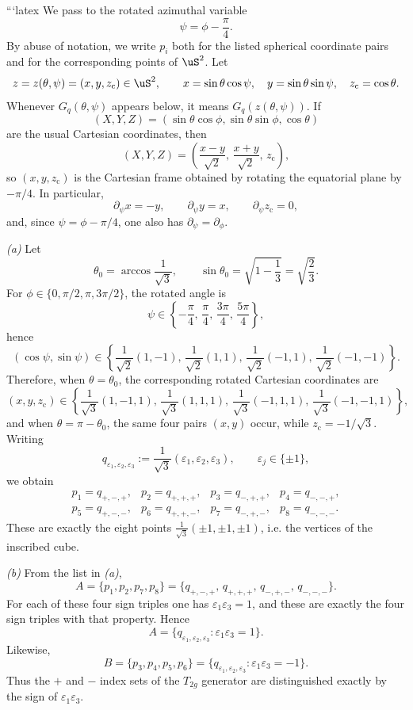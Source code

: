 ```latex
We pass to the rotated azimuthal variable
\[
\psi=\phi-\frac{\pi}{4}.
\]
By abuse of notation, we write \(p_i\) both for the listed spherical coordinate pairs and for the corresponding points of \(\uS^2\). Let
\[
z=z(\theta,\psi)=(x,y,z_{\mathrm c})\in \uS^2,
\qquad
x=\sin\theta\cos\psi,\quad y=\sin\theta\sin\psi,\quad z_{\mathrm c}=\cos\theta.
\]
Whenever \(G_q(\theta,\psi)\) appears below, it means \(G_q(z(\theta,\psi))\). If
\[
(X,Y,Z)=(\sin\theta\cos\phi,\sin\theta\sin\phi,\cos\theta)
\]
are the usual Cartesian coordinates, then
\[
(X,Y,Z)=\left(\frac{x-y}{\sqrt2},\,\frac{x+y}{\sqrt2},\,z_{\mathrm c}\right),
\]
so \((x,y,z_{\mathrm c})\) is the Cartesian frame obtained by rotating the equatorial plane by \(-\pi/4\). In particular,
\[
\partial_\psi x=-y,\qquad \partial_\psi y=x,\qquad \partial_\psi z_{\mathrm c}=0,
\]
and, since \(\psi=\phi-\pi/4\), one also has \(\partial_\psi=\partial_\phi\).

\smallskip
\noindent\emph{(a)} Let
\[
\theta_0=\arccos\!\frac{1}{\sqrt3},
\qquad
\sin\theta_0=\sqrt{1-\frac13}=\sqrt{\frac23}.
\]
For \(\phi\in\{0,\pi/2,\pi,3\pi/2\}\), the rotated angle is
\[
\psi\in\left\{-\frac{\pi}{4},\,\frac{\pi}{4},\,\frac{3\pi}{4},\,\frac{5\pi}{4}\right\},
\]
hence
\[
(\cos\psi,\sin\psi)\in
\left\{
\frac{1}{\sqrt2}(1,-1),\,
\frac{1}{\sqrt2}(1,1),\,
\frac{1}{\sqrt2}(-1,1),\,
\frac{1}{\sqrt2}(-1,-1)
\right\}.
\]
Therefore, when \(\theta=\theta_0\), the corresponding rotated Cartesian coordinates are
\[
(x,y,z_{\mathrm c})\in
\left\{
\frac{1}{\sqrt3}(1,-1,1),\,
\frac{1}{\sqrt3}(1,1,1),\,
\frac{1}{\sqrt3}(-1,1,1),\,
\frac{1}{\sqrt3}(-1,-1,1)
\right\},
\]
and when \(\theta=\pi-\theta_0\), the same four pairs \((x,y)\) occur, while \(z_{\mathrm c}=-1/\sqrt3\). Writing
\[
q_{\varepsilon_1,\varepsilon_2,\varepsilon_3}:=
\frac{1}{\sqrt3}(\varepsilon_1,\varepsilon_2,\varepsilon_3),
\qquad
\varepsilon_j\in\{\pm1\},
\]
we obtain
\[
\begin{array}{llll}
p_1=q_{+,-,+}, & p_2=q_{+,+,+}, & p_3=q_{-,+,+}, & p_4=q_{-,-,+},\\[0.3em]
p_5=q_{+,-,-}, & p_6=q_{+,+,-}, & p_7=q_{-,+,-}, & p_8=q_{-,-,-}.
\end{array}
\]
These are exactly the eight points \(\frac{1}{\sqrt3}(\pm1,\pm1,\pm1)\), i.e. the vertices of the inscribed cube.

\smallskip
\noindent\emph{(b)} From the list in \emph{(a)},
\[
A=\{p_1,p_2,p_7,p_8\}
=\{q_{+,-,+},\,q_{+,+,+},\,q_{-,+,-},\,q_{-,-,-}\}.
\]
For each of these four sign triples one has \(\varepsilon_1\varepsilon_3=1\), and these are exactly the four sign triples with that property. Hence
\[
A=\{q_{\varepsilon_1,\varepsilon_2,\varepsilon_3}:\varepsilon_1\varepsilon_3=1\}.
\]
Likewise,
\[
B=\{p_3,p_4,p_5,p_6\}
=\{q_{\varepsilon_1,\varepsilon_2,\varepsilon_3}:\varepsilon_1\varepsilon_3=-1\}.
\]
Thus the \(+\) and \(-\) index sets of the \(T_{2g}\) generator are distinguished exactly by the sign of \(\varepsilon_1\varepsilon_3\).

